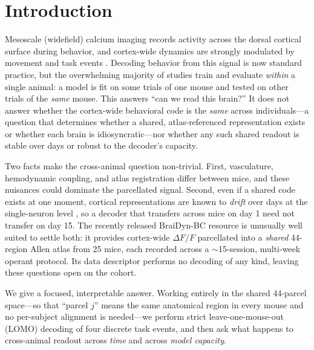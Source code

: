 \documentclass{article}
\begin{document}
\section{Introduction}
Mesoscale (widefield) calcium imaging records activity across the dorsal cortical surface during
behavior, and cortex-wide dynamics are strongly modulated by movement and task events
\citep{musall2019,macdowell2020}. Decoding behavior from this signal is now standard practice,
but the overwhelming majority of studies train and evaluate \emph{within} a single animal: a
model is fit on some trials of one mouse and tested on other trials of the \emph{same} mouse.
This answers ``can we read this brain?'' It does not answer whether the cortex-wide behavioral
code is the \emph{same} across individuals---a question that determines whether a shared,
atlas-referenced representation exists or whether each brain is idiosyncratic---nor whether any
such shared readout is stable over days or robust to the decoder's capacity.

Two facts make the cross-animal question non-trivial. First, vasculature, hemodynamic coupling,
and atlas registration differ between mice, and these nuisances could dominate the parcellated
signal. Second, even if a shared code exists at one moment, cortical representations are known to
\emph{drift} over days at the single-neuron level \citep{rule2020}, so a decoder that transfers
across mice on day 1 need not transfer on day 15. The recently released BraiDyn-BC resource
\citep{kondo2025} is unusually well suited to settle both: it provides cortex-wide $\Delta F/F$
parcellated into a \emph{shared} 44-region Allen atlas from 25 mice, each recorded across a
$\sim$15-session, multi-week operant protocol. Its data descriptor performs no decoding of any
kind, leaving these questions open on the cohort.

We give a focused, interpretable answer. Working entirely in the shared 44-parcel space---so that
``parcel $j$'' means the same anatomical region in every mouse and no per-subject alignment is
needed---we perform strict leave-one-mouse-out (LOMO) decoding of four discrete task events, and
then ask what happens to cross-animal readout across \emph{time} and across \emph{model capacity}.
\end{document}
